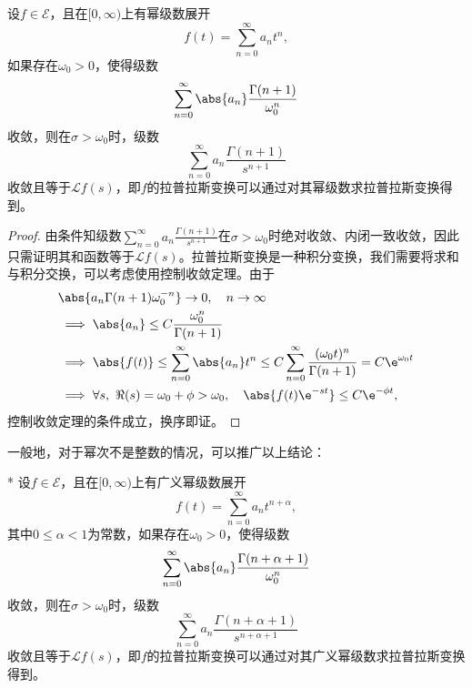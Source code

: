 \begin{theorem}[拉普拉斯变换的级数求法]
    设$f\in\mathcal{E}$，且在$[0,\infty)$上有幂级数展开
    \begin{equation}
        f(t)=\sum_{n=0}^{\infty}a_n t^n,
    \end{equation}
    如果存在$\omega_0>0$，使得级数
    \begin{equation}
        \sum_{n=0}^{\infty}\abs{a_n}\frac{\Gamma(n+1)}{\omega_0^{n}}
    \end{equation}
    收敛，则在$\sigma>\omega_0$时，级数
    \begin{equation}
        \sum_{n=0}^{\infty}a_n\frac{\Gamma(n+1)}{s^{n+1}}
    \end{equation}
    收敛且等于$\mathcal{L}f(s)$，即$f$的拉普拉斯变换可以通过对其幂级数求拉普拉斯变换得到。
\end{theorem}
\begin{proof}
    由条件知级数$\displaystyle\sum_{n=0}^{\infty}a_n\frac{\Gamma(n+1)}{s^{n+1}}$在$\sigma>\omega_0$时绝对收敛、内闭一致收敛，因此只需证明其和函数等于$\mathcal{L}f(s)$。拉普拉斯变换是一种积分变换，我们需要将求和与积分交换，可以考虑使用控制收敛定理。由于
    \begin{align}
        &\abs{a_n\Gamma(n+1)\omega_0^{-n}}\to 0,\quad n\to\infty\nonumber\\
        &\implies \abs{a_n}\leq C\frac{\omega_0^{n}}{\Gamma(n+1)}\nonumber\\
        &\implies \abs{f(t)}\leq \sum_{n=0}^{\infty}\abs{a_n}t^n\leq C\sum_{n=0}^{\infty}\frac{(\omega_0 t)^{n}}{\Gamma(n+1)}=C\e^{\omega_0 t}\nonumber\\
        &\implies \forall s,\ \Re(s)=\omega_0+\phi>\omega_0,\quad \abs{f(t)\e^{-st}}\leq C\e^{-\phi t},
    \end{align}
    控制收敛定理的条件成立，换序即证。
\end{proof}

一般地，对于幂次不是整数的情况，可以推广以上结论：
\begin{corollary}*
    设$f\in\mathcal{E}$，且在$[0,\infty)$上有广义幂级数展开
    \begin{equation}
        f(t)=\sum_{n=0}^{\infty}a_n t^{n+\alpha},
    \end{equation}
    其中$0\leq\alpha<1$为常数，如果存在$\omega_0>0$，使得级数
    \begin{equation}
        \sum_{n=0}^{\infty}\abs{a_n}\frac{\Gamma(n+\alpha+1)}{\omega_0^{n}}
    \end{equation}
    收敛，则在$\sigma>\omega_0$时，级数
    \begin{equation}
        \sum_{n=0}^{\infty}a_n\frac{\Gamma(n+\alpha+1)}{s^{n+\alpha+1}}
    \end{equation}
    收敛且等于$\mathcal{L}f(s)$，即$f$的拉普拉斯变换可以通过对其广义幂级数求拉普拉斯变换得到。
\end{corollary}
